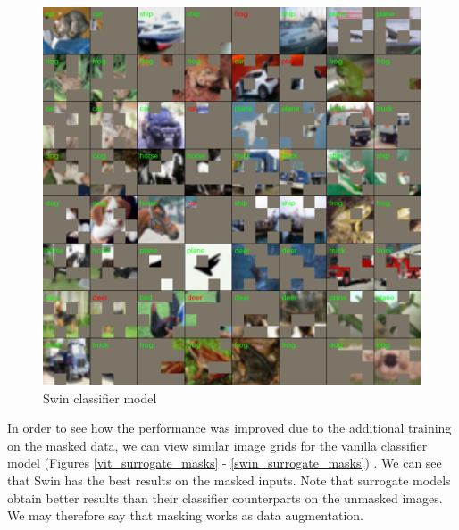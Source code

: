 \documentclass[magisterska,en]{pracamgr}
\begin{document}
\begin{figure}[H]
\centering
\includegraphics[scale=0.5]{./images/swin_classifier_masks.png}
\caption{Swin classifier model}
\label{swin_classifier_masks}
\end{figure}




In order to see how the performance was improved due to the additional training on the masked data, we can view similar image grids for the vanilla classifier model (Figures \ref{vit_surrogate_masks} - \ref{swin_surrogate_masks}) . We can see that Swin has the best results on the masked inputs. Note that surrogate models obtain better results than their classifier counterparts on the unmasked images. We may therefore say that masking works as data augmentation.
\end{document}
